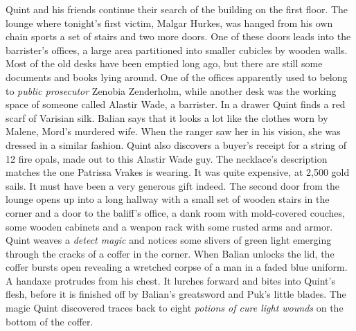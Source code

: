 Quint and his friends continue their search of the building on the first floor. The lounge where tonight's first victim, Malgar Hurkes, was hanged from his own chain sports a set of stairs and two more doors. One of these doors leads into the barrister's offices, a large area partitioned into smaller cubicles by wooden walls. Most of the old desks have been emptied long ago, but there are still some documents and books lying around. One of the offices apparently used to belong to {\itshape public prosecutor} Zenobia Zenderholm, while another desk was the working space of someone called Alastir Wade, a barrister. In a drawer Quint finds a red scarf of Varisian silk. Balian says that it looks a lot like the clothes worn by Malene, Mord's murdered wife. When the ranger saw her in his vision, she was dressed in a similar fashion. Quint also discovers a buyer's receipt for a string of 12 fire opals, made out to this Alastir Wade guy. The necklace's description matches the one Patrissa Vrakes is wearing. It was quite expensive, at 2,500 gold sails. It must have been a very generous gift indeed. The second door from the lounge opens up into a long hallway with a small set of wooden stairs in the corner and a door to the baliff's office, a dank room with mold-covered couches, some wooden cabinets and a weapon rack with some rusted arms and armor. Quint weaves a {\itshape detect magic} and notices some slivers of green light emerging through the cracks of a coffer in the corner. When Balian unlocks the lid, the coffer bursts open revealing a wretched corpse of a man in a faded blue uniform. A handaxe protrudes from his chest. It lurches forward and bites into Quint's flesh, before it is finished off by Balian's greatsword and Puk's little blades. The magic Quint discovered traces back to eight  {\itshape potions of cure light wounds} on the bottom of the coffer. 
